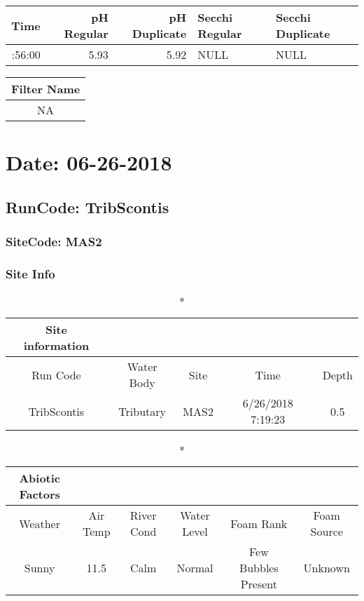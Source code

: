 \documentclass[
  letterpaper,
  DIV=11,
  numbers=noendperiod]{scrartcl}
\begin{document}
\begin{longtable*}{rrrll}
\toprule
Time & pH Regular & pH Duplicate & Secchi Regular & Secchi Duplicate \\ 
\midrule{}:56:00 & 5.93 & 5.92 & NULL & NULL \\ 
\bottomrule
\end{longtable*}

\begin{longtable*}{c}
\toprule
Filter Name \\ 
\midrule\addlinespace[2.5pt]
NA \\ 
\bottomrule
\end{longtable*}

\hypertarget{date-06-26-2018-2}{%
\section{Date: 06-26-2018}\label{date-06-26-2018-2}}

\hypertarget{runcode-tribscontis-2}{%
\subsection{RunCode: TribScontis}\label{runcode-tribscontis-2}}

\hypertarget{sitecode-mas2}{%
\subsubsection{SiteCode: MAS2}\label{sitecode-mas2}}

\subsubsection{Site Info}

\begin{longtable*}{ccccc}
\caption*{
{\large Site information}
} \\ 
\toprule
Run Code & Water Body & Site & Time & Depth \\ 
\midrule\addlinespace[2.5pt]
TribScontis & Tributary & MAS2 & 6/26/2018 7:19:23 & 0.5 \\ 
\bottomrule
\end{longtable*}

\begin{longtable*}{cccccc}
\caption*{
{\large Abiotic Factors}
} \\ 
\toprule
Weather & Air Temp & River Cond & Water Level & Foam Rank & Foam Source \\ 
\midrule\addlinespace[2.5pt]
Sunny & 11.5 & Calm & Normal & Few Bubbles Present & Unknown \\ 
\bottomrule
\end{longtable*}
\end{document}
